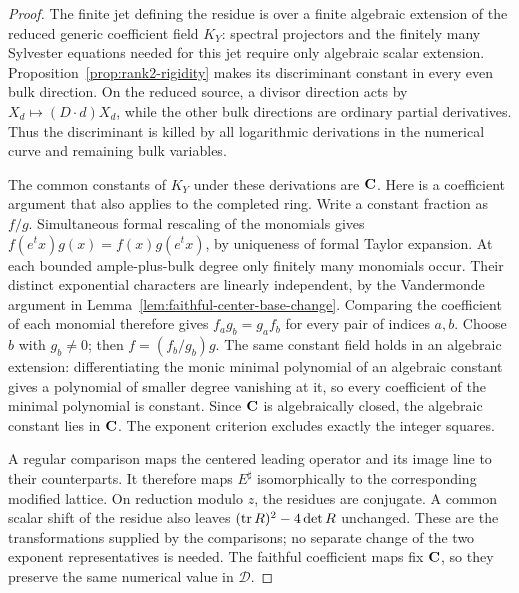 \begin{proof}
The finite jet defining the residue is over a finite algebraic extension
of the reduced generic coefficient field \(K_Y\): spectral projectors
and the finitely many Sylvester equations needed for this jet require
only algebraic scalar extension.  Proposition~\ref{prop:rank2-rigidity}
makes its discriminant constant in every even bulk direction.  On the
reduced source, a divisor direction acts by
\(X_d\mapsto(D\cdot d)X_d\), while the other bulk directions are ordinary
partial derivatives.  Thus the discriminant is killed by all logarithmic
derivations in the numerical curve and remaining bulk variables.

The common constants of \(K_Y\) under these derivations are \(\mathbf C\).
Here is a coefficient argument that also applies to the completed ring.
Write a constant fraction as \(f/g\).  Simultaneous formal rescaling of
the monomials gives \(f(e^t x)g(x)=f(x)g(e^t x)\), by uniqueness of formal
Taylor expansion.  At each bounded ample-plus-bulk degree only finitely
many monomials occur.  Their distinct exponential characters are linearly
independent, by the Vandermonde argument in
Lemma~\ref{lem:faithful-center-base-change}.  Comparing the coefficient
of each monomial therefore gives
\(f_a g_b=g_a f_b\) for every pair of indices \(a,b\).
Choose \(b\) with \(g_b\ne0\); then \(f=(f_b/g_b)g\).
The same constant field holds in an algebraic extension: differentiating
the monic minimal polynomial of an algebraic constant gives a polynomial
of smaller degree vanishing at it, so every coefficient of the minimal
polynomial is constant.  Since \(\mathbf C\) is algebraically closed, the
algebraic constant lies in \(\mathbf C\).  The exponent criterion excludes
exactly the integer squares.

A regular comparison maps the centered leading operator and its image
line to their counterparts.  It therefore maps \(E^\sharp\) isomorphically
to the corresponding modified lattice.  On reduction modulo \(z\), the
residues are conjugate.  A common scalar shift of the residue also leaves
\((\operatorname{tr} R)^2-4\det R\) unchanged.  These are the transformations supplied
by the comparisons; no separate change of the two exponent representatives
is needed.  The faithful coefficient maps fix \(\mathbf C\), so they preserve
the same numerical value in \(\mathcal D\).
%
\end{proof}

